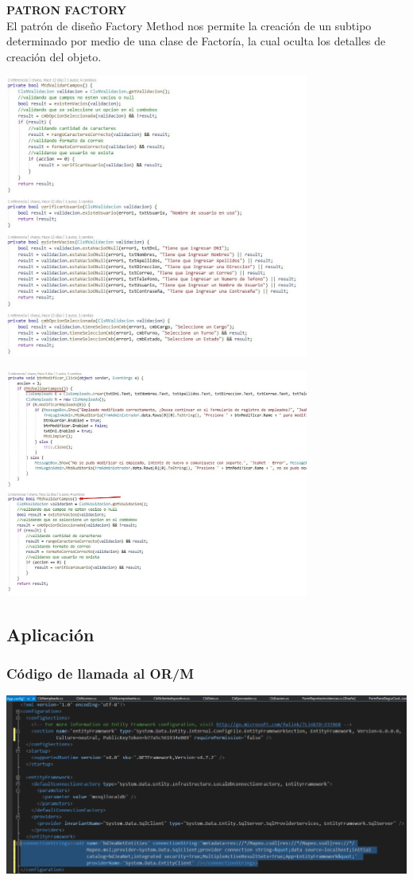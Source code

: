 \documentclass[12pt,letterpaper]{article}
\begin{document}
\textbf{PATRON FACTORY }
\\
El patrón de diseño Factory Method nos permite la creación de un subtipo determinado por medio de una clase de Factoría, la cual oculta los detalles de creación del objeto.
\\
\begin{center}
	\includegraphics[width=10cm]{./img/image14.jpg} 
\end{center}
\begin{center}
	\includegraphics[width=10cm]{./img/image15.jpg} 
\end{center}

\subsection{Aplicación}
\subsubsection{Código de llamada al OR/M}
\begin{center}
	\includegraphics[width=15cm]{./img/image16.png} 
\end{center}
\end{document}

